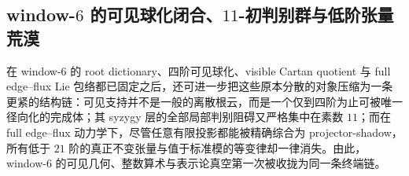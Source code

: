 \subsection{window-\texorpdfstring{$6$}{6} 的可见球化闭合、\texorpdfstring{$11$}{11}-初判别群与低阶张量荒漠}\label{subsec:conclusion-window6-fourier-visible-syzygy-tensor-vacuum}
在 window-\(6\) 的 root dictionary、四阶可见球化、visible Cartan quotient 与 full edge--flux Lie 包络都已固定之后，还可进一步把这些原本分散的对象压缩为一条更紧的结构链：可见支持并不是一般的离散根云，而是一个仅到四阶为止可被唯一径向化的完成体；其 syzygy 层的全部局部判别阻碍又严格集中在素数 \(11\)；而在 full edge--flux 动力学下，尽管任意有限投影都能被精确综合为 projector-shadow，所有低于 \(21\) 阶的真正不变张量与值于标准模的等变律却一律消失。由此，window-\(6\) 的可见几何、整数算术与表示论真空第一次被收拢为同一条终端链。

